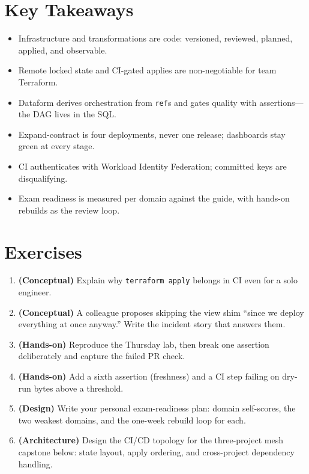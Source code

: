 \section*{Key Takeaways}
\begin{itemize}
    \item Infrastructure and transformations are code: versioned, reviewed, planned, applied, and observable.
    \item Remote locked state and CI-gated applies are non-negotiable for team Terraform.
    \item Dataform derives orchestration from \texttt{ref}s and gates quality with assertions---the DAG lives in the SQL.
    \item Expand-contract is four deployments, never one release; dashboards stay green at every stage.
    \item CI authenticates with Workload Identity Federation; committed keys are disqualifying.
    \item Exam readiness is measured per domain against the guide, with hands-on rebuilds as the review loop.
\end{itemize}

\section{Exercises}
\begin{enumerate}
    \item \textbf{(Conceptual)} Explain why \texttt{terraform apply} belongs in CI even for a solo engineer.
    \item \textbf{(Conceptual)} A colleague proposes skipping the view shim ``since we deploy everything at once anyway.'' Write the incident story that answers them.
    \item \textbf{(Hands-on)} Reproduce the Thursday lab, then break one assertion deliberately and capture the failed PR check.
    \item \textbf{(Hands-on)} Add a sixth assertion (freshness) and a CI step failing on dry-run bytes above a threshold.
    \item \textbf{(Design)} Write your personal exam-readiness plan: domain self-scores, the two weakest domains, and the one-week rebuild loop for each.
    \item \textbf{(Architecture)} Design the CI/CD topology for the three-project mesh capstone below: state layout, apply ordering, and cross-project dependency handling.
\end{enumerate}

